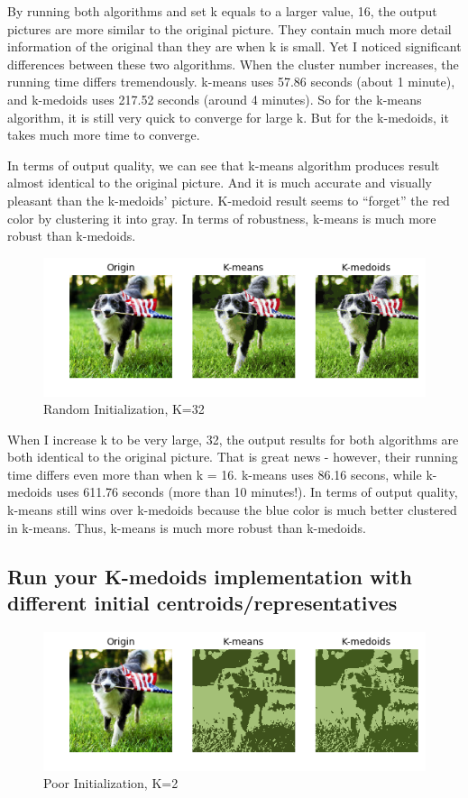 \documentclass{article}
\begin{document}
By running both algorithms and set k equals to a larger value, 16, the output pictures are more similar to the original picture. They contain much more detail information of the original than they are when k is small. Yet I noticed significant differences between these two algorithms. When the cluster number increases, the running time differs tremendously. k-means uses 57.86 seconds (about 1 minute), and k-medoids uses 217.52 seconds (around 4 minutes). So for the k-means algorithm, it is still very quick to converge for large k. But for the k-medoids, it takes much more time to converge. 
\medskip

In terms of output quality, we can see that k-means algorithm produces result almost identical to the original picture. And it is much accurate and visually pleasant than the k-medoids' picture. K-medoid result seems to ``forget'' the red color by clustering it into gray. In terms of robustness, k-means is much more robust than k-medoids. 
\medskip

\begin{figure}[h!]
\centering
  \caption{Random Initialization, K=32}
  \includegraphics[scale=0.6]{dog_k32.png}
\end{figure}

When I increase k to be very large, 32, the output results for both algorithms are both identical to the original picture. That is great news - however, their running time differs even more than when k = 16. k-means uses 86.16 secons, while k-medoids uses 611.76 seconds (more than 10 minutes!). In terms of output quality, k-means still wins over k-medoids because the blue color is much better clustered in k-means. Thus, k-means is much more robust than k-medoids.

\subsection{Run your K-medoids implementation with different initial centroids/representatives}

\begin{figure}[h!]
\centering
  \caption{Poor Initialization, K=2}
  \includegraphics[scale=0.6]{dog_poor_2.png}
\end{figure}
\end{document}
